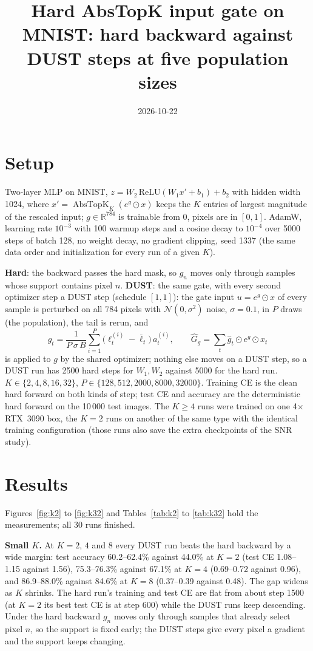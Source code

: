 \documentclass[11pt]{article}
\title{Hard AbsTopK input gate on MNIST: hard backward against DUST steps at five population sizes}
\author{}
\date{2026-10-22}
\begin{document}
\maketitle

\section{Setup}

Two-layer MLP on MNIST, $z = W_2\,\mathrm{ReLU}(W_1 x' + b_1) + b_2$ with
hidden width 1024, where $x' = \operatorname{AbsTopK}_K(e^{g} \odot x)$ keeps
the $K$ entries of largest magnitude of the rescaled input; $g \in
\mathbb{R}^{784}$ is trainable from $0$, pixels are in $[0, 1]$.  AdamW,
learning rate $10^{-3}$ with 100 warmup steps and a cosine decay to $10^{-4}$
over 5000 steps of batch 128, no weight decay, no gradient clipping, seed 1337
(the same data order and initialization for every run of a given $K$).

\textbf{Hard}: the backward passes the hard mask, so $g_n$ moves only through
samples whose support contains pixel $n$.  \textbf{DUST}: the same gate, with
every second optimizer step a DUST step (schedule $[1, 1]$): the gate input
$u = e^{g} \odot x$ of every sample is perturbed on all 784 pixels with
$\mathcal N(0, \sigma^2)$ noise, $\sigma = 0.1$, in $P$ draws (the
population), the tail is rerun, and
$$
\hat g_t = \frac{1}{P\,\sigma\,B} \sum_{i=1}^{P} \bigl(\ell^{(i)}_t - \bar\ell_t\bigr)\, a^{(i)}_t,
\qquad
\hat G_g = \sum_t \hat g_t \odot e^{g} \odot x_t
$$
is applied to $g$ by the shared optimizer; nothing else moves on a DUST step,
so a DUST run has 2500 hard steps for $W_1, W_2$ against 5000 for the hard
run.  $K \in \{2, 4, 8, 16, 32\}$, $P \in \{128, 512, 2000, 8000, 32000\}$.
Training CE is the clean hard forward on both kinds of step; test CE and
accuracy are the deterministic hard forward on the 10\,000 test images.
The $K \ge 4$ runs were trained on one 4$\times$RTX~3090 box, the $K = 2$ runs
on another of the same type with the identical training configuration (those
runs also save the extra checkpoints of the SNR study).

\section{Results}

Figures~\ref{fig:k2} to \ref{fig:k32} and Tables~\ref{tab:k2} to
\ref{tab:k32} hold the measurements; all 30 runs finished.

\textbf{Small $K$.}  At $K = 2$, $4$ and $8$ every DUST run beats the hard
backward by a wide margin: test accuracy 60.2--62.4\% against 44.0\% at
$K = 2$ (test CE 1.08--1.15 against 1.56), 75.3--76.3\% against 67.1\% at
$K = 4$ (0.69--0.72 against 0.96), and 86.9--88.0\% against 84.6\% at
$K = 8$ (0.37--0.39 against 0.48).  The gap widens as $K$ shrinks.  The hard
run's training and test CE are flat from about step 1500 (at $K = 2$ its
best test CE is at step 600) while the DUST runs keep descending.  Under the
hard backward $g_n$ moves only through samples that already select pixel
$n$, so the support is fixed early; the DUST steps give every pixel a
gradient and the support keeps changing.
\end{document}
